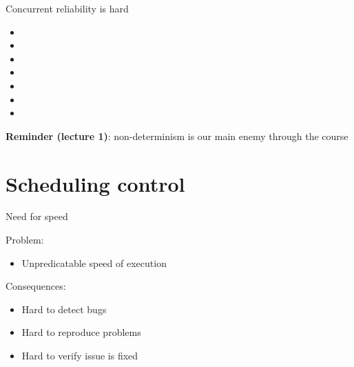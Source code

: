 \begin{frame}[t,fragile]{Concurrent reliability is hard}
\begin{itemize}
  \item \alarmOne
  \item \alarmTwo
  \item \alarmThree
  \item \alarmFour
  \item \alarmFive
  \item \alarmSix
  \item \alarmSeven
\end{itemize}

\pause

\textbf{Reminder (lecture 1)}: non-determinism is our main enemy through the course

\end{frame}


% 
% 

\section{Scheduling control}
\showTOCSub

\begin{frame}[t]{Need for speed}

Problem:
\begin{itemize}
  \item Unpredicatable speed of execution
\end{itemize}

\pause

Consequences:
\begin{itemize}
  \item Hard to detect bugs
  \item Hard to reproduce problems
  \item Hard to verify issue is fixed
\end{itemize}

\end{frame}  

